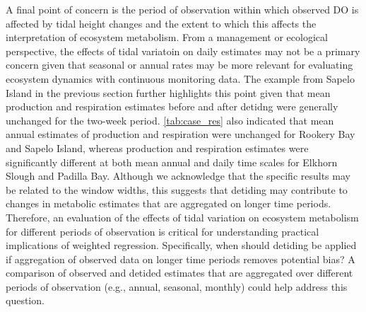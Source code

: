\documentclass[letterpaper,12pt,oneside]{article}\usepackage[]{graphicx}\usepackage[]{color}
\begin{document}
A final point of concern is the period of observation within which observed \ac{DO} is affected by tidal height changes and the extent to which this affects the interpretation of ecosystem metabolism.  From a management or ecological perspective, the effects of tidal variatoin on daily estimates may not be a primary concern given that seasonal or annual rates may be more relevant for evaluating ecosystem dynamics with continuous monitoring data.  The example from Sapelo Island in the previous section further highlights this point given that mean production and respiration estimates before and after detidng were generally unchanged for the two-week period. \cref{tab:case_res} also indicated that mean annual estimates of production and respiration were unchanged for Rookery Bay and Sapelo Island, whereas production and respiration estimates were significantly different at both mean annual and daily time scales for Elkhorn Slough and Padilla Bay. Although we acknowledge that the specific results may be related to the window widths, this suggests that detiding may contribute to changes in metabolic estimates that are aggregated on longer time periods.  Therefore, an evaluation of the effects of tidal variation on ecosystem metabolism for different periods of observation is critical for understanding practical implications of weighted regression.  Specifically, when should detiding be applied if aggregation of observed data on longer time periods removes potential bias?  A comparison of observed and detided estimates that are aggregated over different periods of observation (e.g., annual, seasonal, monthly) could help address this question.
\end{document}
